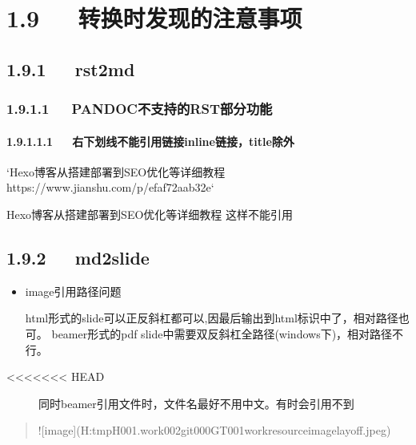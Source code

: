 \documentclass[letterpaper,12pt,english]{sphinxmanual}
\begin{document}
\section{1.9   转换时发现的注意事项}
\label{\detokenize{001software/001install/pandoc:id14}}

\subsection{1.9.1   rst2md}
\label{\detokenize{001software/001install/pandoc:rst2md}}

\subsubsection{1.9.1.1   PANDOC不支持的RST部分功能}
\label{\detokenize{001software/001install/pandoc:pandocrst}}

\paragraph{1.9.1.1.1   右下划线不能引用链接inline链接，title除外}
\label{\detokenize{001software/001install/pandoc:inline-title}}
\begin{sphinxVerbatim}[commandchars=\\\{\}]
`Hexo博客从搭建部署到SEO优化等详细教程 \PYGZlt{}https://www.jianshu.com/p/efaf72aab32e\PYGZgt{}`\PYGZus{}

Hexo博客从搭建部署到SEO优化等详细教程\PYGZus{}
这样不能引用
\end{sphinxVerbatim}


\subsection{1.9.2   md2slide}
\label{\detokenize{001software/001install/pandoc:md2slide}}\begin{itemize}
\item {} 
image引用路径问题

html形式的slide可以正反斜杠都可以,因最后输出到html标识中了，相对路径也可。
beamer形式的pdf slide中需要双反斜杠全路径(windows下)，相对路径不行。

\end{itemize}
\begin{description}
\item[{<<<<<<< HEAD}] \leavevmode
同时beamer引用文件时，文件名最好不用中文。有时会引用不到

\end{description}
\begin{quote}

\begin{sphinxVerbatim}[commandchars=\\\{\}]
![image](H:\PYGZbs{}\PYGZbs{}tmp\PYGZus{}H\PYGZbs{}\PYGZbs{}001.work\PYGZbs{}\PYGZbs{}002git\PYGZbs{}\PYGZbs{}000GT\PYGZbs{}\PYGZbs{}001work\PYGZbs{}\PYGZbs{}resource\PYGZbs{}\PYGZbs{}image\PYGZbs{}\PYGZbs{}layoff.jpeg)
\end{sphinxVerbatim}
\end{quote}
\end{document}
